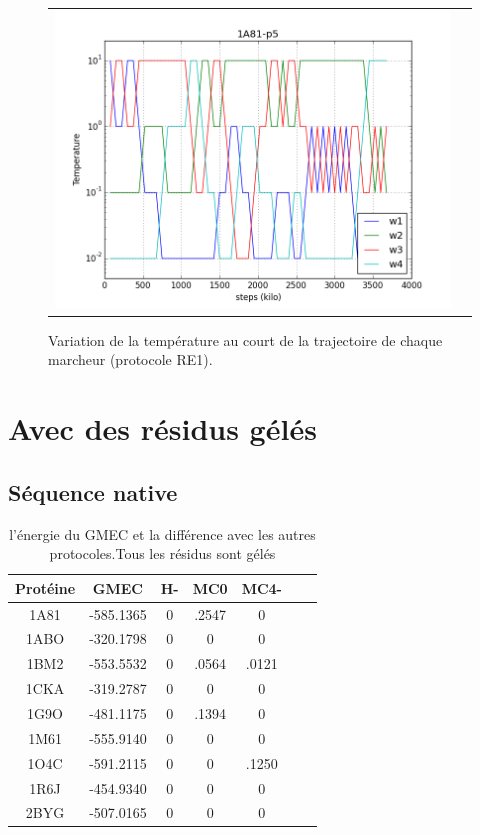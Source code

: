 \documentclass[a4paper,12pt]{article}
\begin{document}
   \begin{figure}[t]
     \centering
     \begin{tabular}{cc}
       \includegraphics[width=12cm]{image/1A81-p5-T_traj.png} &
     \end{tabular}
     
     \caption{Variation de la température au court de la trajectoire de chaque marcheur (protocole RE1).}
     \label{TRAJ_T_RE1}
   \end{figure}

   \section{Avec des résidus gélés}
 
   \subsection{Séquence native}


    \begin{table}[!htbp]
      \centering

      \begin{tabular}{|c|c|c|c|c|c|c|}

        \hline
        Protéine & GMEC & H- & MC0 & MC4- \\
        \hline
        1A81 & -585.1365 & 0 & .2547 & 0 \\
        1ABO & -320.1798 & 0 & 0 & 0 \\
        1BM2 & -553.5532 & 0 & .0564 & .0121 \\
        1CKA & -319.2787 & 0 & 0 & 0 \\
        1G9O & -481.1175 & 0 & .1394 & 0 \\
        1M61 & -555.9140 & 0 & 0 & 0 \\
        1O4C & -591.2115 & 0 & 0 & .1250 \\
        1R6J & -454.9340 & 0 & 0 & 0 \\
        2BYG & -507.0165 & 0 & 0 & 0 \\        
        \hline




      \end{tabular}      
      \caption{l'énergie du GMEC et la différence avec les autres protocoles.Tous les résidus sont gélés}
      \label{tab_best_ener_no_active}      
    \end{table}
\end{document}
